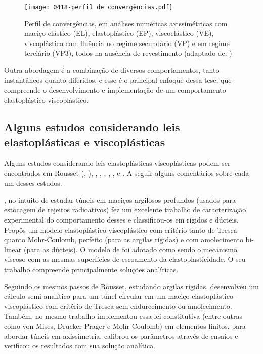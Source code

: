 \begin{figure}[H]
	\begin{center}
		\texttt{[image: 0418-perfil de convergências.pdf]}
	\end{center}
	\caption{\label{perfil_convergencias_sterpi}Perfil de convergências, em análises numéricas axissimétricas com maciço elástico (EL), elastoplástico (EP), viscoelástico (VE), viscoplástico com fluência no regime secundário (VP) e em regime terciário (VP3), todos na ausência de revestimento (adaptado de: )}
\end{figure}

Outra abordagem é a combinação de diversos comportamentos, tanto instantâneos quanto diferidos, e esse é o principal enfoque dessa tese, que compreende o desenvolvimento e implementação de um comportamento elastoplástico-viscoplástico.

\subsection{Alguns estudos considerando leis elastoplásticas e viscoplásticas}

Alguns estudos considerando leis elastoplásticas-viscoplásticas podem ser encontrados em Rousset (\citeyear{Rousset1988}, \citeyear{Rousset1990}), , , , , ,  e . A seguir alguns comentários sobre cada um desses estudos.

\textbf{}, no intuito de estudar túneis em maciços argilosos profundos (usados para estocagem de rejeitos radioativos) fez um excelente trabalho de caracterização experimental do comportamento desses e classificou-os em rígidos e dúcteis. Propôs um modelo elastoplástico-viscoplástico com critério tanto de Tresca quanto Mohr-Coulomb, perfeito (para as argilas rígidas) e com amolecimento bi-linear (para as dúcteis). O modelo de  foi adotado como sendo o mecanismo viscoso com as mesmas superfícies de escoamento da elastoplasticidade. O seu trabalho compreende principalmente soluções analíticas.

Seguindo os mesmos passos de Rousset, \textbf{} estudando argilas rígidas, desenvolveu um cálculo semi-analítico para um túnel circular em um maciço elastoplástico-viscoplástico com critério de Tresca sem endurecimento ou amolecimento. Também, no mesmo trabalho implementou essa lei constitutiva (entre outras como von-Mises, Drucker-Prager e Mohr-Coulomb) em elementos finitos, para abordar túneis em axissimetria, calibrou os parâmetros através de ensaios e verificou os resultados com sua solução analítica.

